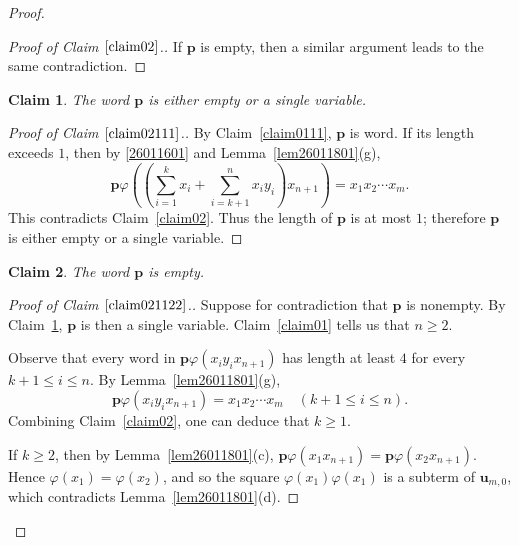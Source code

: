 \documentclass[reqno]{amsart}
\theoremstyle{plain}
\newtheorem{claim}{Claim}[section]
\theoremstyle{definition}
\newcommand{\bp}{\mathbf{p}}
\newcommand{\bu}{\mathbf{u}}
\begin{document}
\begin{proof}
\begin{proof}[Proof of Claim $\ref{claim02}$.]
If $\bp$ is empty, then a similar argument leads to the same contradiction.
\end{proof}


\begin{claim}\label{claim02111}
The word $\bp$ is either empty or a single variable.
\end{claim}
\begin{proof}[Proof of Claim $\ref{claim02111}$.]
By Claim~\ref{claim0111}, $\bp$ is word.
If its length exceeds $1$, then by \eqref{26011601} and Lemma~\ref{lem26011801}(g),
\[
\bp\varphi\left(\left(\sum_{i=1}^kx_i+\sum_{i=k+1}^nx_iy_i\right)x_{n+1}\right)=x_1x_2\cdots x_m.
\]
This contradicts Claim~\ref{claim02}.
Thus the length of $\bp$ is at most $1$;
therefore $\bp$ is either empty or a single variable.
\end{proof}



\begin{claim}\label{claim021122}
The word $\bp$ is empty.
\end{claim}
\begin{proof}[Proof of Claim $\ref{claim021122}$.]
Suppose for contradiction that $\bp$ is nonempty.
By Claim~\ref{claim02111}, $\bp$ is then a single variable.
Claim~\ref{claim01} tells us that $n\geq 2$.

Observe that every word in $\bp\varphi(x_iy_ix_{n+1})$ has length at least $4$ for every $k+1\leq i\leq n$.
By Lemma~\ref{lem26011801}(g),
\begin{equation}\label{26011801}
\bp\varphi(x_iy_ix_{n+1})=x_1x_2\cdots x_m \quad (k+1\leq i\leq n).
\end{equation}
Combining Claim~\ref{claim02}, one can deduce that $k\geq 1$.

If $k\geq 2$, then by Lemma~\ref{lem26011801}(c),
$\bp\varphi(x_1x_{n+1})=\bp\varphi(x_2x_{n+1})$.
Hence $\varphi(x_1)=\varphi(x_2)$, and so the square $\varphi(x_1)\varphi(x_1)$
is a subterm of $\bu_{m, 0}$, which contradicts Lemma~\ref{lem26011801}(d).


\end{proof}
\end{proof}
\end{document}
